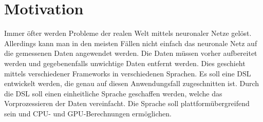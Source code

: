 
\chapter{Motivation}
\setcounter{page}{1}
Immer öfter werden Probleme der realen Welt mittels neuronaler Netze gelöst.
Allerdings kann man in den meisten Fällen nicht einfach das neuronale Netz auf die gemessenen Daten angewendet werden.
Die Daten müssen vorher aufbereitet werden und gegebenenfalls unwichtige Daten entfernt werden.
Dies geschieht mittels verschiedener Frameworks in verschiedenen Sprachen.
Es soll eine \ac{DSL} entwickelt werden, die genau auf diesen Anwendungsfall zugeschnitten ist.
Durch die \ac{DSL} soll einen einheitliche Sprache geschaffen werden, welche das Vorprozessieren der Daten vereinfacht.
Die Sprache soll plattformübergreifend sein und \ac{CPU}- und \ac{GPU}-Berechnungen ermöglichen.

\endinput
